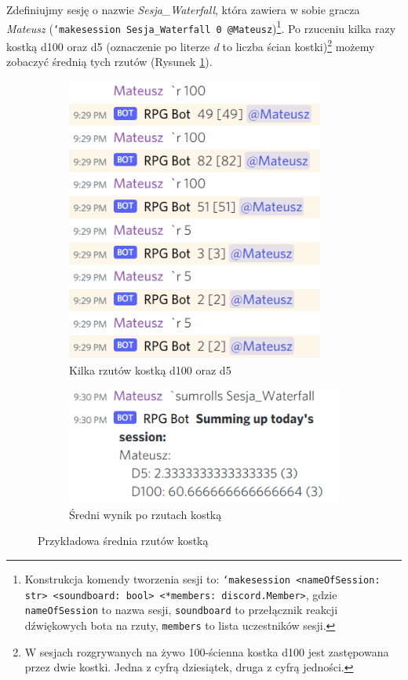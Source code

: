 \documentclass[shortabstract,inz]{iithesis}
\begin{document}
			Zdefiniujmy sesję o nazwie \textit{Sesja\_Waterfall}, która zawiera w sobie gracza \textit{Mateusz} (\texttt{`makesession Sesja\_Waterfall 0 @Mateusz})\footnote{Konstrukcja komendy tworzenia sesji to: \texttt{`makesession <nameOfSession: str> <soundboard: bool> <*members: discord.Member>}, gdzie \texttt{nameOfSession} to nazwa sesji, \texttt{soundboard} to przełącznik reakcji dźwiękowych bota na rzuty, \texttt{members} to lista uczestników sesji.}. Po rzuceniu kilka razy kostką d100 oraz d5 (oznaczenie po literze \textit{d} to liczba ścian kostki)\footnote{W sesjach rozgrywanych na żywo 100-ścienna kostka d100 jest zastępowana przez dwie kostki. Jedna z cyfrą dziesiątek, druga z cyfrą jedności.} możemy zobaczyć średnią tych rzutów (Rysunek \ref{rollResult}).
			
			\begin{figure}[!h]
				\centering
				\begin{subfigure}[b]{.49\textwidth}
					\centering
					\includegraphics[width=0.93\textwidth]{rollExample}
					\caption{Kilka rzutów kostką d100 oraz d5}
				\end{subfigure}
				\hfill
				\begin{subfigure}[b]{.49\textwidth}
					\centering
					\includegraphics[width=1\textwidth]{rollsResult}
					\caption{Średni wynik po rzutach kostką}
				\end{subfigure}
				\caption{Przykładowa średnia rzutów kostką}
				\label{rollResult}
			\end{figure}
	
\end{document}

